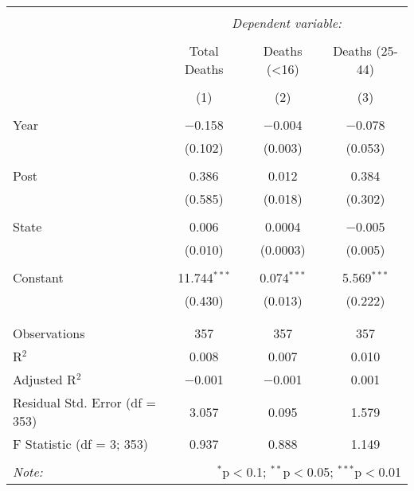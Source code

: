 \documentclass[11pt]{article}
\begin{document}
\begin{table}[!htbp] \centering 
  \caption{} 
  \label{} 
\begin{tabular}{@{\extracolsep{5pt}}lccc} 
\\[-1.8ex]\hline 
\hline \\[-1.8ex] 
 & \multicolumn{3}{c}{\textit{Dependent variable:}} \\ 
\cline{2-4} 
\\[-1.8ex] & Total Deaths & Deaths (\textless 16) & Deaths (25-44) \\ 
\\[-1.8ex] & (1) & (2) & (3)\\ 
\hline \\[-1.8ex] 
 Year & $-$0.158 & $-$0.004 & $-$0.078 \\ 
  & (0.102) & (0.003) & (0.053) \\ 
  & & & \\ 
 Post & 0.386 & 0.012 & 0.384 \\ 
  & (0.585) & (0.018) & (0.302) \\ 
  & & & \\ 
 State & 0.006 & 0.0004 & $-$0.005 \\ 
  & (0.010) & (0.0003) & (0.005) \\ 
  & & & \\ 
 Constant & 11.744$^{***}$ & 0.074$^{***}$ & 5.569$^{***}$ \\ 
  & (0.430) & (0.013) & (0.222) \\ 
  & & & \\ 
\hline \\[-1.8ex] 
Observations & 357 & 357 & 357 \\ 
R$^{2}$ & 0.008 & 0.007 & 0.010 \\ 
Adjusted R$^{2}$ & $-$0.001 & $-$0.001 & 0.001 \\ 
Residual Std. Error (df = 353) & 3.057 & 0.095 & 1.579 \\ 
F Statistic (df = 3; 353) & 0.937 & 0.888 & 1.149 \\ 
\hline 
\hline \\[-1.8ex] 
\textit{Note:}  & \multicolumn{3}{r}{$^{*}$p$<$0.1; $^{**}$p$<$0.05; $^{***}$p$<$0.01} \\ 
\end{tabular} 
\end{table} 
\end{document}
